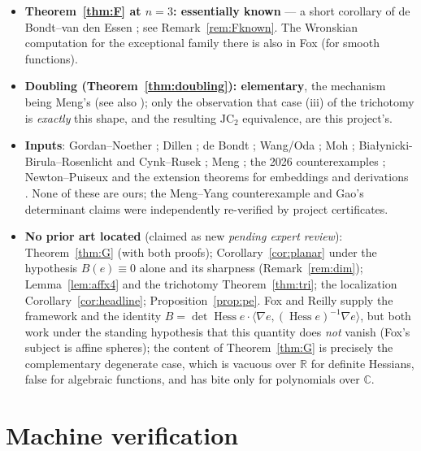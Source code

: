 \documentclass[11pt]{article}
\theoremstyle{plain}
\theoremstyle{definition}
\newcommand{\C}{\mathbb{C}}
\newcommand{\R}{\mathbb{R}}
\newcommand{\Hess}{\operatorname{Hess}}
\newcommand{\JC}{\mathrm{JC}}
\begin{document}
\begin{itemize}
\cite[Prop.~4]{Reilly}; Fox \cite{Fox2017}, whose invariant $U(F)$ is
exactly $B$ and who proves $U(F)=\mathcal{K}\,|dF|^{\,n+2}$. The
underlying bordered-determinant expansion is Cauchy's.
\item\textbf{Theorem~\ref{thm:F} at $n=3$: essentially known} --- a
short corollary of de Bondt--van den Essen \cite[Thm.~3.3]{dBvdE}; see
Remark~\ref{rem:Fknown}. The Wronskian computation for the exceptional
family there is also in Fox \cite{Fox2017} (for smooth functions).
\item\textbf{Doubling (Theorem~\ref{thm:doubling}): elementary}, the
mechanism being Meng's \cite{Meng2006} (see also
\cite[Prop.~2.3]{MengYang}); only the observation that case (iii) of
the trichotomy is \emph{exactly} this shape, and the resulting $\JC_2$
equivalence, are this project's.
\item\textbf{Inputs}: Gordan--Noether \cite{GN,WdB}; Dillen
\cite{Dillen}; de Bondt \cite{deBondt2015}; Wang/Oda \cite{Wang,BCW};
Moh \cite{Moh}; Bia{\l}ynicki-Birula--Rosenlicht \cite{BBR} and
Cynk--Rusek \cite{CynkRusek}; Meng \cite{Meng2006}; the 2026
counterexamples \cite{MengYang,Gao}; Newton--Puiseux \cite{Walker} and
the extension theorems for embeddings and derivations \cite{Lang}. None
of these are ours; the Meng--Yang counterexample and Gao's determinant
claims were independently re-verified by project certificates.
\item\textbf{No prior art located} (claimed as new \emph{pending expert
review}): Theorem~\ref{thm:G} (with both proofs);
Corollary~\ref{cor:planar} under the hypothesis $B(e)\equiv0$ alone and
its sharpness (Remark~\ref{rem:dim}); Lemma~\ref{lem:affx4} and the
trichotomy Theorem~\ref{thm:tri}; the localization
Corollary~\ref{cor:headline}; Proposition~\ref{prop:pe}. Fox and Reilly
supply the framework and the identity
$B=\det\Hess e\cdot\langle\nabla e,(\Hess e)^{-1}\nabla e\rangle$, but
both work under the standing hypothesis that this quantity does
\emph{not} vanish (Fox's subject is affine spheres); the content of
Theorem~\ref{thm:G} is precisely the complementary degenerate case,
which is vacuous over $\R$ for definite Hessians, false for algebraic
functions, and has bite only for polynomials over $\C$.
\end{itemize}

\appendix

\section{Machine verification}\label{sec:verification}
\end{document}
